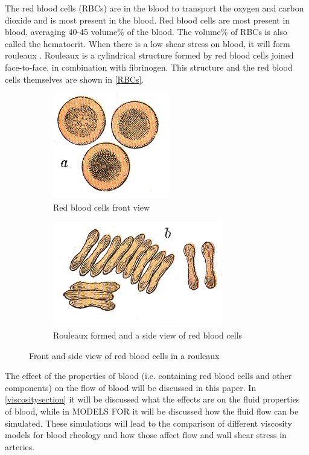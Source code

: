 The red blood cells (RBCs) are in the blood to transport the oxygen and carbon dioxide and is most present in the blood. Red blood cells are most present in blood, averaging 40-45 volume\% of the blood. The volume\% of RBCs is also called the hematocrit. When there is a low shear stress on blood, it will form rouleaux \cite{merill}. Rouleaux is a cylindrical structure formed by red blood cells joined face-to-face, in combination with fibrinogen. This structure and the red blood cells themselves are shown in \autoref{RBCs}.
\begin{figure}[b]
\centering
	\begin{subfigure}[b]{0.4 \textwidth}
	\includegraphics[scale = 0.75]{gray-a.png}
	\caption{Red blood cells front view \cite{GRAY}}
	\label{rbcfront}
	\end{subfigure}
	\begin{subfigure}[b]{0.55 \textwidth}
	\includegraphics[scale = 0.75]{gray-b.png}
	\caption{Rouleaux formed and a side view of red blood cells \cite{GRAY}}
	\label{rouleaux}
	\end{subfigure}
\caption{Front and side view of red blood cells in a rouleaux}
\label{RBCs}
\end{figure}
The effect of the properties of blood (i.e. containing red blood cells and other components) on the flow of blood will be discussed in this paper. In \autoref{viscositysection} it will be discussed what the effects are on the fluid properties of blood, while in MODELS FOR it will be discussed how the fluid flow can be simulated. These simulations will lead to the comparison of different viscosity models for blood rheology and how those affect flow and wall shear stress in arteries. 
